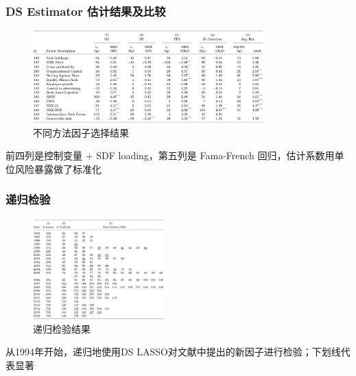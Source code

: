\documentclass[
  UTF8,
  xcolor={dvipsnames,rgb},
  hyperref={colorlinks, citecolor=orange, linkcolor=black},
  aspectratio=169
  ]{beamer}
\begin{document}
\begin{frame}
    \frametitle{DS Estimator 估计结果及比较}

    \begin{figure}[H]
    \begin{center}
    \includegraphics[width=0.8\textwidth]{../assets/DS.png}
    \end{center}
    \caption{不同方法因子选择结果}
    \label{pic:DS}
    \end{figure}
    前四列是控制变量 + SDF loading，第五列是 Fama-French 回归，估计系数用单位风险暴露做了标准化

\end{frame}

\begin{frame}
    \frametitle{递归检验}
    \begin{figure}[H]
    \begin{center}
    \includegraphics[width=0.45\textwidth]{../assets/recursive.png}
    \end{center}
    \caption{递归检验结果}
    \label{pic:recursive}
    \end{figure}
    
    从1994年开始，递归地使用DS LASSO对文献中提出的新因子进行检验；下划线代表显著

\end{frame}
\end{document}
